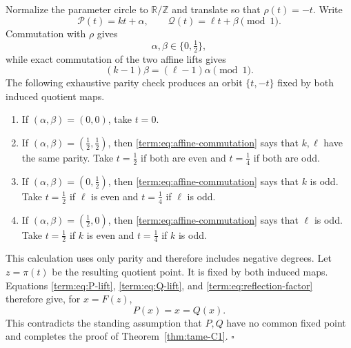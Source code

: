 \documentclass[11pt]{article}
\theoremstyle{definition}
\theoremstyle{remark}
\begin{document}
Normalize the parameter circle to \(\mathbb R/\mathbb Z\) and translate so
that \(\rho(t)=-t\).  Write
\[
 \mathcal P(t)=kt+\alpha,\qquad
 \mathcal Q(t)=\ell t+\beta\pmod1.
\]
Commutation with \(\rho\) gives
\begin{equation}\label{term:eq:half-translations}
 \alpha,\beta\in\{0,\tfrac12\},
\end{equation}
while exact commutation of the two affine lifts gives
\begin{equation}\label{term:eq:affine-commutation}
 (k-1)\beta=(\ell-1)\alpha\pmod1.
\end{equation}
The following exhaustive parity check produces an orbit
\(\{t,-t\}\) fixed by both induced quotient maps.
\begin{enumerate}
 \item[(i)] If \((\alpha,\beta)=(0,0)\), take \(t=0\).
 \item[(ii)] If \((\alpha,\beta)=(\tfrac12,\tfrac12)\), then
 \eqref{term:eq:affine-commutation} says that \(k,\ell\) have the same
 parity.  Take \(t=\tfrac12\) if both are even and \(t=\tfrac14\) if both
 are odd.
 \item[(iii)] If \((\alpha,\beta)=(0,\tfrac12)\), then
 \eqref{term:eq:affine-commutation} says that \(k\) is odd.  Take
 \(t=\tfrac12\) if \(\ell\) is even and \(t=\tfrac14\) if \(\ell\) is odd.
 \item[(iv)] If \((\alpha,\beta)=(\tfrac12,0)\), then
 \eqref{term:eq:affine-commutation} says that \(\ell\) is odd.  Take
 \(t=\tfrac12\) if \(k\) is even and \(t=\tfrac14\) if \(k\) is odd.
\end{enumerate}
This calculation uses only parity and therefore includes negative degrees.
Let \(z=\pi(t)\) be the resulting quotient point.  It is fixed by both
induced maps.  Equations \eqref{term:eq:P-lift},
\eqref{term:eq:Q-lift}, and \eqref{term:eq:reflection-factor} therefore give,
for \(x=F(z)\),
\[
 P(x)=x=Q(x).
\]
This contradicts the standing assumption that \(P,Q\) have no common fixed
point and completes the proof of Theorem~\ref{thm:tame-C1}.
\hfill\(\square\)\par
\end{document}
